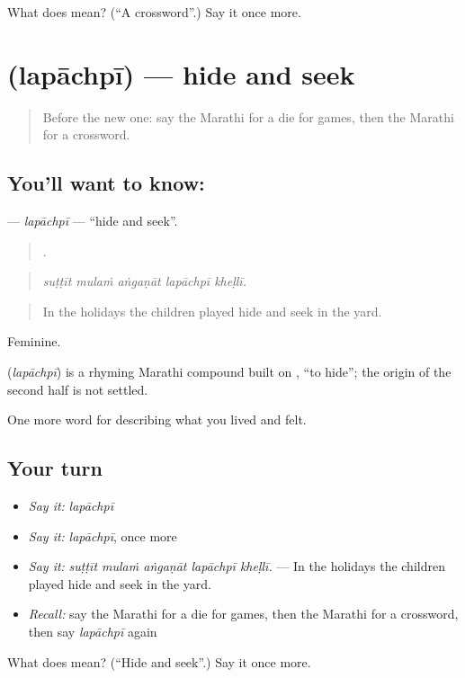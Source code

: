 \begin{tcolorbox}[breakable,colback=teal!4,colframe=teal!35!black,title={Before you move on}]
What does  mean? (\textquotedblleft{}A crossword\textquotedblright{}.) Say it once more.
\end{tcolorbox}
\section[\texorpdfstring{\mr{लपाछपी} (lapāchpī)}{लपाछपी (lapāchpī)}]{ (lapāchpī) — hide and seek}

\label{lesson:MR-C532-lapachpi}



\begin{quote}
Before the new one: say the Marathi for a die for games, then the Marathi for a crossword.
\end{quote}

\subsection*{You'll want to know: }
\textbf{} — \emph{lapāchpī} — \textquotedblleft{}hide and seek\textquotedblright{}.

\begin{quote}
    .
\end{quote}

\begin{quote}
\emph{suṭṭīt mulaṁ aṅgaṇāt lapāchpī kheḷlī.}
\end{quote}

\begin{quote}
In the holidays the children played hide and seek in the yard.
\end{quote}

Feminine.

\begin{cousinweb}
\textbf{} (\emph{lapāchpī}) is a rhyming Marathi compound built on , \textquotedblleft{}to hide\textquotedblright{}; the origin of the second half is not settled.
\end{cousinweb}

\begin{grammarlens}[title={What you've built}]
One more word for describing what you lived and felt.
\end{grammarlens}

\subsection*{Your turn}
\begin{itemize}
\raggedright
  \item \emph{Say it:} \emph{lapāchpī}
  \item \emph{Say it:} \emph{lapāchpī}, once more
  \item \emph{Say it:} \emph{suṭṭīt mulaṁ aṅgaṇāt lapāchpī kheḷlī.} — In the holidays the children played hide and seek in the yard.
  \item \emph{Recall:} say the Marathi for a die for games, then the Marathi for a crossword, then say \emph{lapāchpī} again
\end{itemize}

\begin{tcolorbox}[breakable,colback=teal!4,colframe=teal!35!black,title={Before you move on}]
What does  mean? (\textquotedblleft{}Hide and seek\textquotedblright{}.) Say it once more.
\end{tcolorbox}
